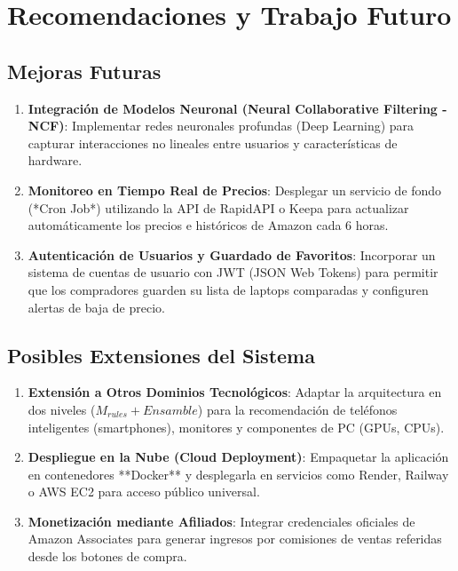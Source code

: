 \chapter{Recomendaciones y Trabajo Futuro}

\section{Mejoras Futuras}
\begin{enumerate}
    \item \textbf{Integración de Modelos Neuronal (Neural Collaborative Filtering - NCF)}: Implementar redes neuronales profundas (Deep Learning) para capturar interacciones no lineales entre usuarios y características de hardware.
    \item \textbf{Monitoreo en Tiempo Real de Precios}: Desplegar un servicio de fondo (*Cron Job*) utilizando la API de RapidAPI o Keepa para actualizar automáticamente los precios e históricos de Amazon cada 6 horas.
    \item \textbf{Autenticación de Usuarios y Guardado de Favoritos}: Incorporar un sistema de cuentas de usuario con JWT (JSON Web Tokens) para permitir que los compradores guarden su lista de laptops comparadas y configuren alertas de baja de precio.
\end{enumerate}

\section{Posibles Extensiones del Sistema}
\begin{enumerate}
    \item \textbf{Extensión a Otros Dominios Tecnológicos}: Adaptar la arquitectura en dos niveles ($M_{rules} + Ensamble$) para la recomendación de teléfonos inteligentes (smartphones), monitores y componentes de PC (GPUs, CPUs).
    \item \textbf{Despliegue en la Nube (Cloud Deployment)}: Empaquetar la aplicación en contenedores **Docker** y desplegarla en servicios como Render, Railway o AWS EC2 para acceso público universal.
    \item \textbf{Monetización mediante Afiliados}: Integrar credenciales oficiales de Amazon Associates para generar ingresos por comisiones de ventas referidas desde los botones de compra.
\end{enumerate}